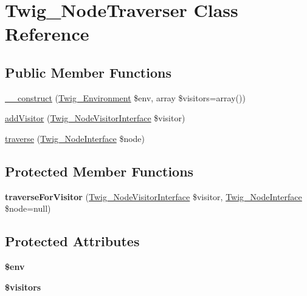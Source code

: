 \hypertarget{class_twig___node_traverser}{}\section{Twig\+\_\+\+Node\+Traverser Class Reference}
\label{class_twig___node_traverser}
\subsection*{Public Member Functions}
\begin{DoxyCompactItemize}
\item 
\hyperlink{class_twig___node_traverser_abfc6550d22500c2fd6e9df3364b90503}{\+\_\+\+\_\+construct} (\hyperlink{class_twig___environment}{Twig\+\_\+\+Environment} \$env, array \$visitors=array())
\item 
\hyperlink{class_twig___node_traverser_a3a90d966767b0b5dfd3439b6240ad547}{add\+Visitor} (\hyperlink{interface_twig___node_visitor_interface}{Twig\+\_\+\+Node\+Visitor\+Interface} \$visitor)
\item 
\hyperlink{class_twig___node_traverser_a825bac4a4ce64a5a5213f9599196e7f4}{traverse} (\hyperlink{interface_twig___node_interface}{Twig\+\_\+\+Node\+Interface} \$node)
\end{DoxyCompactItemize}
\subsection*{Protected Member Functions}
\begin{DoxyCompactItemize}
\item 
\hypertarget{class_twig___node_traverser_acd52b9b58ba0f5d931ef7a074e87c7bb}{}{\bfseries traverse\+For\+Visitor} (\hyperlink{interface_twig___node_visitor_interface}{Twig\+\_\+\+Node\+Visitor\+Interface} \$visitor, \hyperlink{interface_twig___node_interface}{Twig\+\_\+\+Node\+Interface} \$node=null)\label{class_twig___node_traverser_acd52b9b58ba0f5d931ef7a074e87c7bb}

\end{DoxyCompactItemize}
\subsection*{Protected Attributes}
\begin{DoxyCompactItemize}
\item 
\hypertarget{class_twig___node_traverser_aa99ce9ae015e958eef5782267276fbb4}{}{\bfseries \$env}\label{class_twig___node_traverser_aa99ce9ae015e958eef5782267276fbb4}

\item 
\hypertarget{class_twig___node_traverser_a63a73490fa0428629a602fd9042a95aa}{}{\bfseries \$visitors}\label{class_twig___node_traverser_a63a73490fa0428629a602fd9042a95aa}

\end{DoxyCompactItemize}



